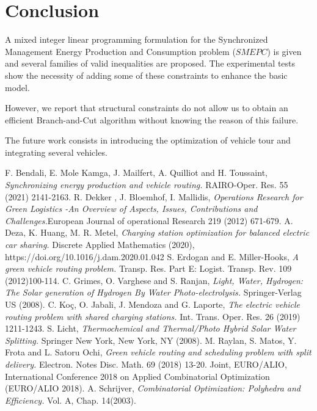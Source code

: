 \documentclass[11pt]{article}
\theoremstyle{plain}%
\theoremstyle{definition} \newtheorem{lem}{Lemma}[section]
\theoremstyle{definition} \newtheorem{claim}{Claim}[lem]
\theoremstyle{definition} \newtheorem{theorem}{Theorem}[section]
\theoremstyle{definition} \newtheorem{exo}{Exercice n$^\circ$}
\theoremstyle{definition} \newtheorem{quest}{}[exo]
\theoremstyle{definition} \newtheorem{sousquest}{}[quest]
\theoremstyle{remark}
\theoremstyle{definition}
\begin{document}
\section{Conclusion}\label{sec7}
A mixed integer linear programming formulation for the Synchronized Management Energy Production and Consumption problem ($SMEPC$) is given and several families of valid inequalities are proposed. The experimental tests show the necessity of adding some of these constraints to enhance the basic model.

However, we report that structural constraints do not allow us to obtain an efficient Branch-and-Cut algorithm without knowing the reason of this failure. 

The future work consists in introducing the optimization of  vehicle tour and integrating several vehicles.

\begin{thebibliography}{999}
 F. Bendali, E. Mole Kamga, J. 
Mailfert, A.  Quilliot and H. Toussaint, {\it Synchronizing energy production and vehicle routing.} RAIRO-Oper. Res. 55 (2021) 2141-2163.
 R.  Dekker , J.  Bloemhof,  I.  Mallidis,  {\it Operations Research for Green Logistics -An Overview of Aspects, Issues, Contributions and Challenges.}European Journal of operational Research 219 (2012) 671-679.
 A. Deza, K. Huang, M. R. Metel, {\it Charging station optimization for balanced electric car sharing.} Discrete Applied Mathematics (2020), https://doi.org/10.1016/j.dam.2020.01.042
 S. Erdogan and E. Miller-Hooks, {\it A green vehicle routing problem.} Transp. Res. Part E: Logist. Transp. Rev. 109 (2012)100-114.
 C. Grimes, O. Varghese and S. Ranjan, {\it Light, Water, Hydrogen: The Solar generation of Hydrogen By Water Photo-electrolysis.} Springer-Verlag US (2008).
 C. Ko\c{c}, O. Jabali, J. Mendoza and G. Laporte, {\it The electric vehicle routing problem with shared charging stations.} Int. Trans.
Oper. Res. 26 (2019) 1211-1243.
 S. Licht, {\it Thermochemical and Thermal/Photo Hybrid Solar Water Splitting.} Springer New York, New York, NY (2008).
 M. Raylan, S. Matos, Y. Frota and L. Satoru Ochi, {\it  Green vehicle routing and scheduling problem with split delivery.} Electron. Notes Disc. Math. 69 (2018) 13-20. Joint, EURO/ALIO, International Conference 2018 on Applied Combinatorial Optimization (EURO/ALIO 2018).
 A. Schrijver, {\it Combinatorial Optimization: Polyhedra and Efficiency.} Vol. A, Chap. 14(2003).
\end{thebibliography}
%
\end{document}

